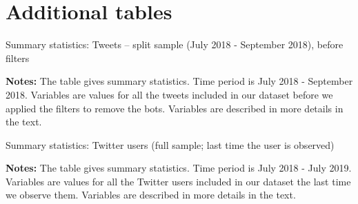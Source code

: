 \clearpage 
\pagebreak

\section{Additional tables \label{Sec:AdTables}}

\begin{table}
\caption{Summary statistics: Tweets -- split sample (July 2018 - September 2018), before filters}
\begin{center}
	
\end{center}
\begin{spacing}{0.5}
	{\fns \textbf{Notes:} The table gives summary statistics. Time period is July 2018 - September 2018. Variables are values for all the tweets included in our dataset before we applied the filters to remove the bots. Variables are described in more details in the text.} 
\end{spacing}
\label{Tab:sum_stat_tweets_split_sample_bflitre}
\end{table} 


\begin{table}
\caption{Summary statistics: Twitter users (full sample; last time the user is observed)}
\begin{center}
	
\end{center}
\begin{spacing}{0.5}
	{\fns \textbf{Notes:} The table gives summary statistics. Time period is July 2018 - July 2019. Variables are values for all the Twitter users included in our dataset the last time we observe them. Variables are described in more details in the text.} 
\end{spacing}
\label{Tab:table_summary_users_all_last}
\end{table} 


